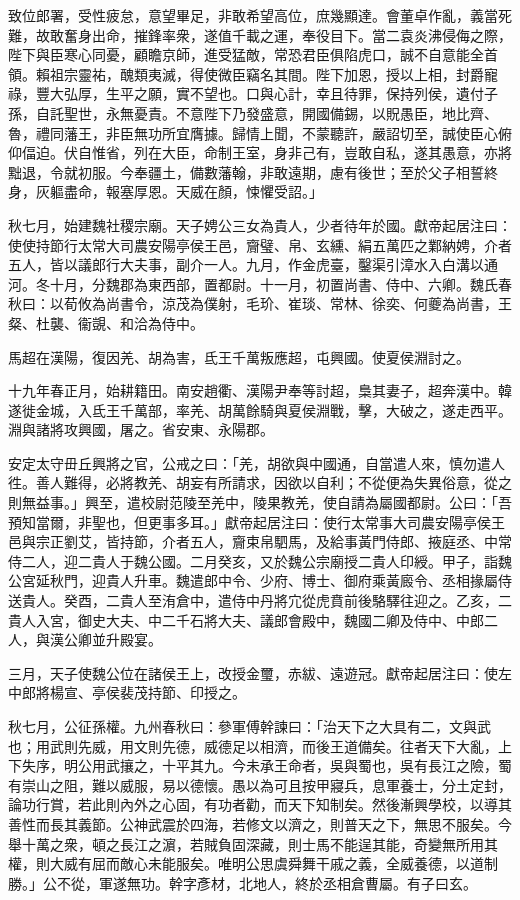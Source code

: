 \begin{pinyinscope}
致位郎署，受性疲怠，意望畢足，非敢希望高位，庶幾顯達。會董卓作亂，義當死難，故敢奮身出命，摧鋒率衆，遂值千載之運，奉役目下。當二袁炎沸侵侮之際，陛下與臣寒心同憂，顧瞻京師，進受猛敵，常恐君臣俱陷虎口，誠不自意能全首領。賴祖宗靈祐，醜類夷滅，得使微臣竊名其間。陛下加恩，授以上相，封爵寵祿，豐大弘厚，生平之願，實不望也。口與心計，幸且待罪，保持列侯，遺付子孫，自託聖世，永無憂責。不意陛下乃發盛意，開國備錫，以貺愚臣，地比齊、魯，禮同藩王，非臣無功所宜膺據。歸情上聞，不蒙聽許，嚴詔切至，誠使臣心俯仰偪迫。伏自惟省，列在大臣，命制王室，身非己有，豈敢自私，遂其愚意，亦將黜退，令就初服。今奉疆土，備數藩翰，非敢遠期，慮有後世；至於父子相誓終身，灰軀盡命，報塞厚恩。天威在顏，悚懼受詔。」

秋七月，始建魏社稷宗廟。天子娉公三女為貴人，少者待年於國。獻帝起居注曰：使使持節行太常大司農安陽亭侯王邑，齎璧、帛、玄纁、絹五萬匹之鄴納娉，介者五人，皆以議郎行大夫事，副介一人。九月，作金虎臺，鑿渠引漳水入白溝以通河。冬十月，分魏郡為東西部，置都尉。十一月，初置尚書、侍中、六卿。魏氏春秋曰：以荀攸為尚書令，涼茂為僕射，毛玠、崔琰、常林、徐奕、何夔為尚書，王粲、杜襲、衞覬、和洽為侍中。

馬超在漢陽，復因羌、胡為害，氐王千萬叛應超，屯興國。使夏侯淵討之。

十九年春正月，始耕籍田。南安趙衢、漢陽尹奉等討超，梟其妻子，超奔漢中。韓遂徙金城，入氐王千萬部，率羌、胡萬餘騎與夏侯淵戰，擊，大破之，遂走西平。淵與諸將攻興國，屠之。省安東、永陽郡。

安定太守毌丘興將之官，公戒之曰：「羌，胡欲與中國通，自當遣人來，慎勿遣人徃。善人難得，必將教羌、胡妄有所請求，因欲以自利；不從便為失異俗意，從之則無益事。」興至，遣校尉范陵至羌中，陵果教羌，使自請為屬國都尉。公曰：「吾預知當爾，非聖也，但更事多耳。」獻帝起居注曰：使行太常事大司農安陽亭侯王邑與宗正劉艾，皆持節，介者五人，齎束帛駟馬，及給事黃門侍郎、掖庭丞、中常侍二人，迎二貴人于魏公國。二月癸亥，又於魏公宗廟授二貴人印綬。甲子，詣魏公宮延秋門，迎貴人升車。魏遣郎中令、少府、博士、御府乘黃廄令、丞相掾屬侍送貴人。癸酉，二貴人至洧倉中，遣侍中丹將宂從虎賁前後駱驛往迎之。乙亥，二貴人入宮，御史大夫、中二千石將大夫、議郎會殿中，魏國二卿及侍中、中郎二人，與漢公卿並升殿宴。

三月，天子使魏公位在諸侯王上，改授金璽，赤紱、遠遊冠。獻帝起居注曰：使左中郎將楊宣、亭侯裴茂持節、印授之。

秋七月，公征孫權。九州春秋曰：參軍傅幹諫曰：「治天下之大具有二，文與武也；用武則先威，用文則先德，威德足以相濟，而後王道備矣。往者天下大亂，上下失序，明公用武攘之，十平其九。今未承王命者，吳與蜀也，吳有長江之險，蜀有崇山之阻，難以威服，易以德懷。愚以為可且按甲寢兵，息軍養士，分土定封，論功行賞，若此則內外之心固，有功者勸，而天下知制矣。然後漸興學校，以導其善性而長其義節。公神武震於四海，若修文以濟之，則普天之下，無思不服矣。今舉十萬之衆，頓之長江之濵，若賊負固深藏，則士馬不能逞其能，奇變無所用其權，則大威有屈而敵心未能服矣。唯明公思虞舜舞干戚之義，全威養德，以道制勝。」公不從，軍遂無功。幹字彥材，北地人，終於丞相倉曹屬。有子曰玄。


\end{pinyinscope}
